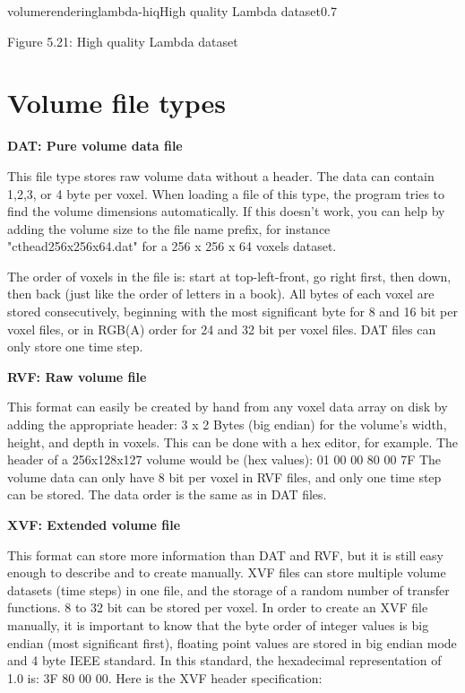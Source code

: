 \begin{covimg}{volumerendering}{lambda-hiq}{High quality Lambda dataset}{0.7}\end{covimg}
\begin{htmlonly}
Figure 5.21: High quality Lambda dataset
\vspace{0.5cm}
\end{htmlonly}

\clearpage

\section{Volume file types}

{\bf DAT: Pure volume data file}

This file type stores raw volume data without a header. The data can contain 1,2,3, or 4 byte per voxel.
When loading a file of this type, the program tries to find the volume dimensions automatically. If this
doesn't work, you can help by adding the volume size to the file name prefix, 
for instance "cthead256x256x64.dat" for a 256 x 256 x 64 voxels dataset. 

The order of voxels in the file is: start at top-left-front, go right first, then down, then back 
(just like the order of letters in a book).
All bytes of each voxel are stored consecutively, beginning with the most
significant byte for 8 and 16 bit per voxel files, or in RGB(A) order for 24 and 32 bit per voxel files.
DAT files can only store one time step.

{\bf RVF: Raw volume file}

This format can easily be created by hand from any voxel data array on disk 
by adding the appropriate header: 3 x 2 Bytes (big endian) for the volume's width, height, 
and depth in voxels. This can be done with a hex editor, for example. 
The header of a 256x128x127 volume would be (hex values): 01 00 00 80 00 7F 
The volume data can only have 8 bit per voxel in RVF files, and only one time step can be stored. 
The data order is the same as in DAT files.

{\bf XVF: Extended volume file}

This format can store more information than DAT and RVF, but it is still easy enough to describe and to 
create manually. XVF files can store multiple volume datasets (time steps) in one file, 
and the storage of a random number of transfer functions. 8 to 32 bit can be stored per voxel.
In order to create an XVF file manually, it is important to know that the byte order of integer
values is big endian (most significant first), floating point values are stored in big endian
mode and 4 byte IEEE standard. In this standard, the hexadecimal representation of 1.0 is: 3F 80 00 00. 
Here is the XVF header specification:

